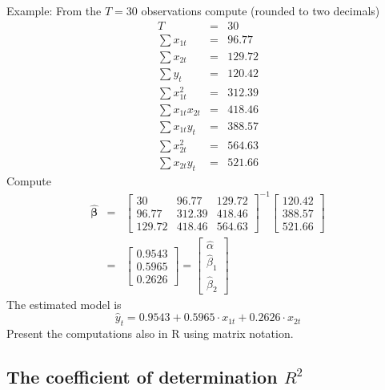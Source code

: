 \documentclass{article}
\begin{document}
Example:
From the $T=30$ observations compute (rounded to two decimals)%
\begin{eqnarray*}
	T &=&30 \\
	\sum x_{1t} &=&96.77 \\
	\sum x_{2t} &=&129.72 \\
	\sum y_{t} &=&120.42 \\
	\sum x_{1t}^{2} &=&312.39 \\
	\sum x_{1t}x_{2t} &=&418.46 \\
	\sum x_{1t}y_{t} &=&388.57 \\
	\sum x_{2t}^{2} &=&564.63 \\
	\sum x_{2t}y_{t} &=&521.66
\end{eqnarray*}%
Compute%
\begin{eqnarray*}
	\mathbf{\hat{\beta}} &\mathbf{=}&\left[ 
	\begin{array}{lll}
		30 & 96.77 & 129.72 \\ 
		96.77 & 312.39 & 418.46 \\ 
		129.72 & 418.46 & 564.63%
	\end{array}%
	\right] ^{-1}\left[ 
	\begin{array}{l}
		120.42 \\ 
		388.57 \\ 
		521.66%
	\end{array}%
	\right] \\
	&=&\left[ 
	\begin{array}{l}
		0.9543 \\ 
		0.5965 \\ 
		0.2626%
	\end{array}%
	\right] =\left[ 
	\begin{array}{l}
		\hat{\alpha} \\ 
		\hat{\beta}_{1} \\ 
		\hat{\beta}_{2}%
	\end{array}%
	\right]
\end{eqnarray*}%
The estimated model is%
\[
\hat{y}_{t}=0.9543+0.5965\cdot x_{1t}+0.2626\cdot x_{2t} 
\]%
Present the computations also in R using matrix notation.


\subsection*{The coefficient of determination $R^{2}$}
\end{document}
